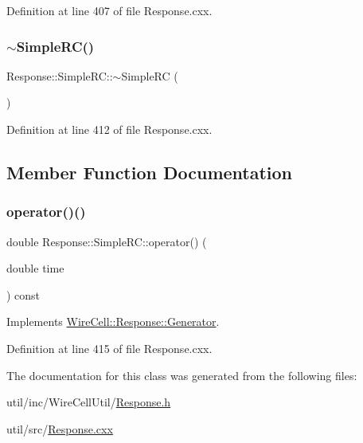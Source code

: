 Definition at line 407 of file Response.\+cxx.

\mbox{\label{class_wire_cell_1_1_response_1_1_simple_r_c_aa01e593768153361361d17af2932e8e2}} 
\subsubsection{\texorpdfstring{$\sim$\+Simple\+R\+C()}{~SimpleRC()}}
{\footnotesize\ttfamily Response\+::\+Simple\+R\+C\+::$\sim$\+Simple\+RC (\begin{DoxyParamCaption}{ }\end{DoxyParamCaption})\hspace{0.3cm}{\ttfamily [virtual]}}



Definition at line 412 of file Response.\+cxx.



\subsection{Member Function Documentation}
\mbox{\label{class_wire_cell_1_1_response_1_1_simple_r_c_a161bf08999bc62f35b1b1c5569053e06}} 
\subsubsection{\texorpdfstring{operator()()}{operator()()}}
{\footnotesize\ttfamily double Response\+::\+Simple\+R\+C\+::operator() (\begin{DoxyParamCaption}\item[{double}]{time }\end{DoxyParamCaption}) const\hspace{0.3cm}{\ttfamily [virtual]}}



Implements \hyperlink{class_wire_cell_1_1_response_1_1_generator_a216d7f7bd22a1a781b6b00bd988e0136}{Wire\+Cell\+::\+Response\+::\+Generator}.



Definition at line 415 of file Response.\+cxx.



The documentation for this class was generated from the following files\+:\begin{DoxyCompactItemize}
\item 
util/inc/\+Wire\+Cell\+Util/\hyperlink{_response_8h}{Response.\+h}\item 
util/src/\hyperlink{_response_8cxx}{Response.\+cxx}\end{DoxyCompactItemize}
